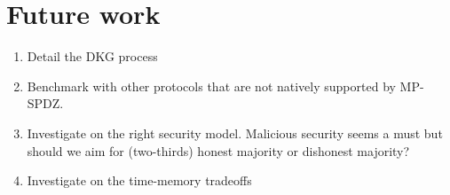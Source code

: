 \section{Future work}

\begin{enumerate}
	\item Detail the DKG process
	\item Benchmark with other protocols that are not natively supported by MP-SPDZ.
	\item Investigate on the right security model. Malicious security seems a must but should we aim for (two-thirds) honest majority or dishonest majority?
	\item Investigate on the time-memory tradeoffs
\end{enumerate}